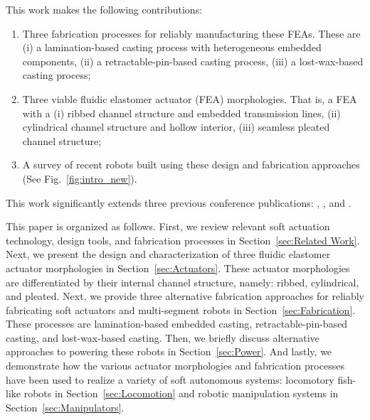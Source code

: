 This work makes the following contributions:
\begin{enumerate}
  \item Three fabrication processes for reliably manufacturing these FEAs. These are (i) a lamination-based casting process with heterogeneous embedded components, (ii) a retractable-pin-based casting process, (iii) a lost-wax-based casting process;
 \item Three viable fluidic elastomer actuator (FEA) morphologies. That is, a FEA with a (i) ribbed channel structure and embedded transmission lines, (ii) cylindrical channel structure and hollow interior, (iii) seamless pleated channel structure;
  \item A survey of recent robots built using these design and fabrication approaches (See Fig.~\ref{fig:intro_new}).
\end{enumerate}
This work significantly extends three previous conference publications: \citep{marchese2014design}, \citep{marchese2014whole}, and \citep{katzschmann2015autonomous}.

This paper is organized as follows. 
First, we review relevant soft actuation technology, design tools, and fabrication processes in Section~\ref{sec:Related Work}.
%
Next, we present the design and characterization of three fluidic elastomer actuator morphologies in Section~\ref{sec:Actuators}.
%
These actuator morphologies are differentiated by their internal channel structure, namely: ribbed, cylindrical, and pleated.
%
Next, we provide three alternative fabrication approaches for reliably fabricating soft actuators and multi-segment robots in Section~\ref{sec:Fabrication}.
%
These processes are lamination-based embedded casting, retractable-pin-based casting, and lost-wax-based casting.
%
Then, we briefly discuss alternative approaches to powering these robots in Section~\ref{sec:Power}.
%
And lastly, we demonstrate how the various actuator morphologies and fabrication processes have been used to realize a variety of soft autonomous systems: locomotory fish-like robots in Section~\ref{sec:Locomotion} and robotic manipulation systems in Section~\ref{sec:Manipulators}.